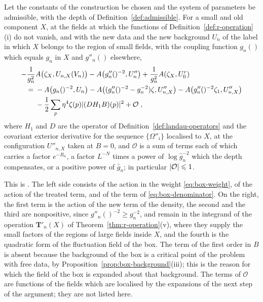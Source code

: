 \documentclass[11pt]{preprint}
\makeatletter
\DeclarePairedDelimiter{\abs}{\lvert}{\rvert}
\newcommand*{\bigcdot}{}%
\DeclareRobustCommand*{\bigcdot}{%
	\mathbin{\mathpalette\bigcdot@{}}%
}
\newcommand*{\bigcdot@scalefactor}{.7}
\newcommand*{\bigcdot@widthfactor}{1.15}
\newcommand*{\bigcdot@}[2]{%
	\sbox0{$#1\vcenter{}$}%
	\sbox2{$#1\cdot\m@th$}%
	\hbox to \bigcdot@widthfactor\wd2{%
		\hss
		\raise\ht0\hbox{%
			\scalebox{\bigcdot@scalefactor}{%
				\lower\ht0\hbox{$#1\bullet\m@th$}%
			}%
		}%
		\hss
	}%
}
\numberwithin{equation}{section}
\makeatother
\begin{document}
\begin{proposition}\label{prop:wilson-terms}
Let the constants of the construction be chosen and the system of parameters be admissible, with the depth of Definition~\ref{def:admissible}. For a small and old component $X$, at the fields at which the functions of Definition~\ref{def:r-operation}(i) do not vanish, and with the new data and the new background $U_n$ of the label in which $X$ belongs to the region of small fields, with the coupling function $g_n(\bigcdot)$ which equals $g_n$ in $X$ and $g''_n(\bigcdot)$ elsewhere,
\begin{equation}\label{eq:wilson-terms}
\begin{aligned}
    -\frac{1}{g_n^2}&A\bigl(\zeta_X, U_{n,X}(V_n)\bigr) - A\bigl(g''_n(\bigcdot)^{-2}, U''_n\bigr) + \frac{1}{g_n^2}A(\zeta_X, U^r_0)\\
    ={}& -A\bigl(g_n(\bigcdot)^{-2}, U_n\bigr) - A\bigl((g''_n(\bigcdot)^{-2} - g_n^{-2})\zeta, U''_{n,X}\bigr) - A\bigl(g''_n(\bigcdot)^{-2}\zeta_1, U''_{n,X}\bigr)\\
    &- \frac{1}{2}\sum_p\eta^4\zeta(p)\abs{(DH_1B)(p)}^2 + \mathcal O\;,
\end{aligned}
\end{equation}
where $H_1$ and $D$ are the operator of Definition~\ref{def:landau-operators} and the covariant exterior derivative for the sequence $\{ \Omega''_i \}$ localised to $X$, at the configuration $U''_{n,X}$ taken at $B = 0$, and $\mathcal O$ is a sum of terms each of which carries a factor $e^{-R_n}$, a factor $L^{-N}$ times a power of $\log\hat g_n^{-2}$ which the depth compensates, or a positive power of $\hat g_n$; in particular $\abs{\mathcal O} \leqslant 1$.
\end{proposition}

This is \cite[(1.14)--(1.37), pp.~359--365]{BalabanLFR2}. The left side consists of the action in the weight \eqref{eq:box-weight}, of the action of the treated term, and of the term of \eqref{eq:box-denominator}. On the right, the first term is the action of the new term of the density, the second and the third are nonpositive, since $g''_n(\bigcdot)^{-2} \geqslant g_n^{-2}$, and remain in the integrand of the operation $\mathbf T'_n(X)$ of Theorem~\ref{thm:r-operation}(v), where they supply the small factors of the regions of large fields inside $X$, and the fourth is the quadratic form of the fluctuation field of the box. The term of the first order in $B$ is absent because the background of the box is a critical point of the problem with free data, by Proposition~\ref{prop:box-background}(iii); this is the reason for which the field of the box is expanded about that background. The terms of $\mathcal O$ are functions of the fields which are localised by the expansions of the next step of the argument; they are not listed here.
\end{document}
